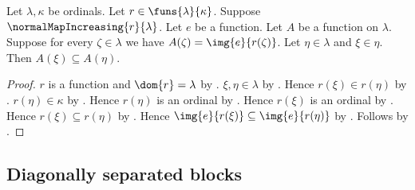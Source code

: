 \begin{proposition}\label{increasing_initial_image_family_nested}
    Let $\lambda,\kappa$ be ordinals.
    Let $r\in\funs{\lambda}{\kappa}$.
    Suppose $\normalMapIncreasing{r}{\lambda}$.
    Let $e$ be a function.
    Let $A$ be a function on $\lambda$.
    Suppose for every $\zeta\in\lambda$ we have
        $A(\zeta)=\img{e}{r(\zeta)}$.
    Let $\eta\in\lambda$ and $\xi\in\eta$.
    Then $A(\xi)\subseteq A(\eta)$.
\end{proposition}
\begin{proof}
    $r$ is a function and $\dom{r}=\lambda$ by
        .
    $\xi,\eta\in\lambda$ by .
    Hence $r(\xi)\in r(\eta)$ by .
    $r(\eta)\in\kappa$ by .
    Hence $r(\eta)$ is an ordinal by
        .
    Hence $r(\xi)$ is an ordinal by
        .
    Hence $r(\xi)\subseteq r(\eta)$ by
        .
    Hence $\img{e}{r(\xi)}\subseteq\img{e}{r(\eta)}$ by
        .
    Follows by \auto.
\end{proof}

\subsection{Diagonally separated blocks}

